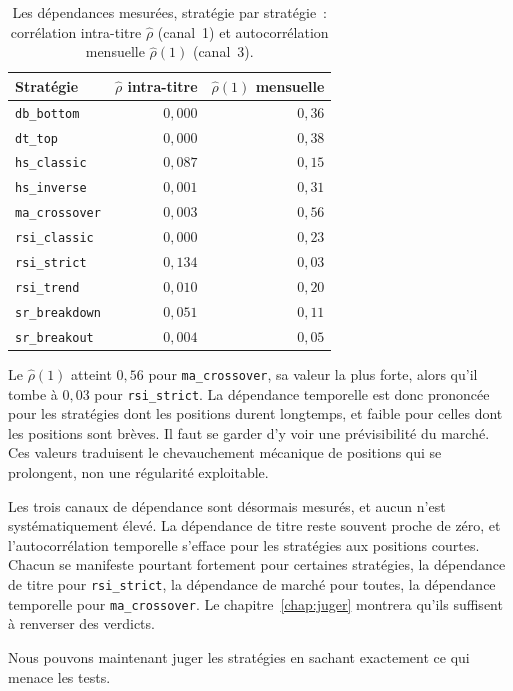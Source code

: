 \begin{table}[H]
\centering
\caption{Les dépendances mesurées, stratégie par stratégie~:
corrélation intra-titre $\hat\rho$ (canal~1) et autocorrélation
mensuelle $\hat\rho(1)$ (canal~3).}
\label{tab:dep-mesures}
\small
\begin{tabular}{@{}lrr@{}}
\toprule
Stratégie & $\hat\rho$ intra-titre & $\hat\rho(1)$ mensuelle \\
\midrule
\texttt{db\_bottom}    & $0{,}000$ & $0{,}36$ \\
\texttt{dt\_top}       & $0{,}000$ & $0{,}38$ \\
\texttt{hs\_classic}   & $0{,}087$ & $0{,}15$ \\
\texttt{hs\_inverse}   & $0{,}001$ & $0{,}31$ \\
\texttt{ma\_crossover} & $0{,}003$ & $0{,}56$ \\
\texttt{rsi\_classic}  & $0{,}000$ & $0{,}23$ \\
\texttt{rsi\_strict}   & $0{,}134$ & $0{,}03$ \\
\texttt{rsi\_trend}    & $0{,}010$ & $0{,}20$ \\
\texttt{sr\_breakdown} & $0{,}051$ & $0{,}11$ \\
\texttt{sr\_breakout}  & $0{,}004$ & $0{,}05$ \\
\bottomrule
\end{tabular}
\end{table}

Le $\hat\rho(1)$ atteint $0{,}56$ pour \texttt{ma\_crossover}, sa valeur la
plus forte, alors qu'il tombe à $0{,}03$ pour \texttt{rsi\_strict}. La
dépendance temporelle est donc prononcée pour les stratégies dont les
positions durent longtemps, et faible pour celles dont les positions sont
brèves. Il faut se garder d'y voir une prévisibilité du marché. Ces valeurs
traduisent le chevauchement mécanique de positions qui se prolongent, non une
régularité exploitable.

Les trois canaux de dépendance sont désormais mesurés, et aucun n'est
systématiquement élevé. La dépendance de titre reste souvent proche de zéro,
et l'autocorrélation temporelle s'efface pour les stratégies aux positions
courtes. Chacun se manifeste pourtant fortement pour certaines stratégies, la
dépendance de titre pour \texttt{rsi\_strict}, la dépendance de marché pour
toutes, la dépendance temporelle pour \texttt{ma\_crossover}. Le
chapitre~\ref{chap:juger} montrera qu'ils suffisent à renverser des verdicts.

Nous pouvons maintenant juger les stratégies en sachant exactement ce qui
menace les tests.
